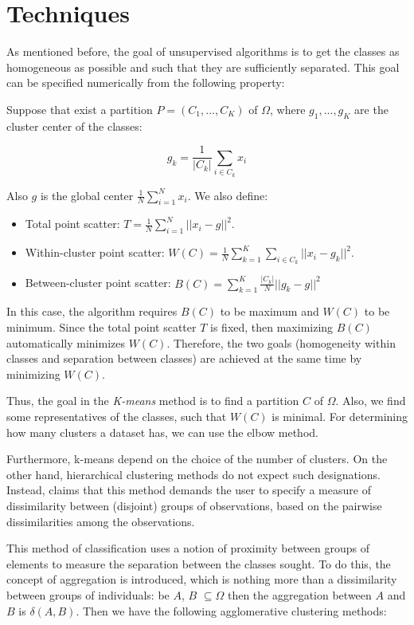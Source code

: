 \documentclass[11pt,]{article}
\begin{document}
\section{Techniques}\label{techniques}

As mentioned before, the goal of unsupervised algorithms is to get the
classes as homogeneous as possible and such that they are sufficiently
separated. This goal can be specified numerically from the following
property:

Suppose that exist a partition \(P = (C_{1},..., C_{K})\) of \(\Omega\),
where \(g_{1},..., g_{K}\) are the cluster center of the classes:

\[g_{k} = \frac{1}{|C_{k}|} \sum_{i \in C_{k} }{x_{i}} \]

Also \(g\) is the global center
\(\frac{1}{N} \sum_{i = 1 }^{N} {x_{i}}\). We also define:

\begin{itemize}
\item
  Total point scatter:
  \(T = \frac{1}{N} \sum_{i = 1 }^{N} {|| x_{i} - g ||}^{2}\).
\item
  Within-cluster point scatter:
  \(W(C) = \frac{1}{N} \sum_{k = 1 }^{K} \sum_{i \in C_{k}} {|| x_{i} - g_{k} ||}^{2}\).
\item
  Between-cluster point scatter:
  \(B(C) = \sum_{k = 1}^{K} \frac{|C_{k}|}{N} {|| g_{k} - g ||}^{2}\)
\end{itemize}

In this case, the algorithm requires \(B(C)\) to be maximum and \(W(C)\)
to be minimum. Since the total point scatter \(T\) is fixed, then
maximizing \(B(C)\) automatically minimizes \(W(C)\). Therefore, the two
goals (homogeneity within classes and separation between classes) are
achieved at the same time by minimizing \(W(C)\).

Thus, the goal in the \emph{K-means} method is to find a partition \(C\)
of \(\Omega\). Also, we find some representatives of the classes, such
that \(W(C)\) is minimal. For determining how many clusters a dataset
has, we can use the elbow method.

Furthermore, k-means depend on the choice of the number of clusters. On
the other hand, hierarchical clustering methods do not expect such
designations. Instead, \citet{xie2013ddrk} claims that this method
demands the user to specify a measure of dissimilarity between
(disjoint) groups of observations, based on the pairwise dissimilarities
among the observations.

This method of classification uses a notion of proximity between groups
of elements to measure the separation between the classes sought. To do
this, the concept of aggregation is introduced, which is nothing more
than a dissimilarity between groups of individuals: be \(A\), \(B\)
\(\subseteq \Omega\) then the aggregation between \(A\) and \(B\) is
\(\delta(A,B)\). Then we have the following agglomerative clustering
methods:
\end{document}
